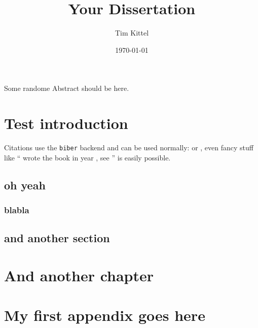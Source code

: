 \documentclass{simple-dissertation}
\title{Your Dissertation}
\date{\today}
\author{Tim Kittel}
\begin{document}
\maketitle

\pagestyle{thesis-preface}


Some randome Abstract should be here.



\cleartorecto
\tableofcontents

\cleartorecto
\pagestyle{thesis}

\chapter{Test introduction}

Citations use the \verb|biber| backend and can be used normally: \cite{heitzig2016topology} or \citet{heitzig2016topology}, even fancy stuff like ``\citeauthor{kuznetsov1998elements} wrote the book  in year \citeyear{kuznetsov1998elements}, see \cite{kuznetsov1998elements}'' is easily possible.

\lipsum

\section{oh yeah}

\subsection{blabla}

\section{and another section}

\lipsum

\chapter{And another chapter}


\lipsum

\appendix
\chapter{My first appendix goes here}



\printbibliography
\end{document}
